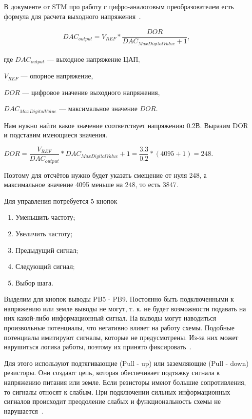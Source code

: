	В документе от STM про работу с цифро-аналоговым преобразователем есть формула для расчета выходного напряжения~\cite{an3126}.
	
	\begin{gather}
	DAC_{output} = V_{REF}*\dfrac{DOR}{DAC_{MaxDigitalValue} + 1},
	\end{gather}
	
	где $DAC_{output}$ --- выходное напряжение ЦАП,
	
	$V_{REF}$ --- опорное напряжение,
	
	$DOR$ --- цифровое значение выходного напряжения,
	
	$DAC_{MaxDigitalValue}$ --- максимальное значение $DOR$.
	
	Нам нужно найти какое значение соответствует напряжению 0.2В. Выразим DOR и подставим имеющиеся значения.
	
	\begin{center}
	$DOR = \dfrac{V_{REF}}{DAC_{output}}*DAC_{MaxDigitalValue} + 1 = \dfrac{3.3}{0.2}*(4095+1) = 248.$
	\end{center}
	
	Поэтому для отсчётов нужно будет указать смещение от нуля 248, а максимальное значение 4095 меньше на 248, то есть 3847. 
	
	Для управления потребуется 5 кнопок
	\begin{enumerate}
		\item Уменьшить частоту;
		\item Увеличить частоту;
		\item Предыдущий сигнал;
		\item Следующий сигнал;
		\item Выбор шага.
	\end{enumerate}
	
	Выделим для кнопок выводы PB5 - PB9. Постоянно быть подключенными к напряжению или земле выводы не могут, т. к. не будет возможности подавать на них какой-либо информационный сигнал. На выводы могут наводиться произвольные потенциалы, что негативно влияет на работу схемы. Подобные потенциалы имитируют сигналы, которые не предусмотрены. Из-за них может нарушиться логика работы, поэтому их принято фиксировать~\cite{schemat}. 
	
	Для этого используют подтягивающие (Pull - up) или заземляющие (Pull - down) резисторы. Они создают цепь, которая обеспечивает подтяжку сигнала к напряжению питания или земле. Если резисторы имеют большие сопротивления, то сигналы относят к слабым. При подключении сильных информационных сигналов происходит преодоление слабых и функциональность схемы не нарушается~\cite{butres}.
	
